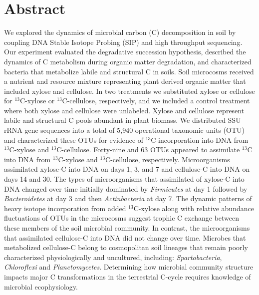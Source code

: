 \section{Abstract} We explored the dynamics of microbial carbon (C)
decomposition in soil by coupling DNA Stable Isotope Probing (SIP) and high
throughput sequencing. Our experiment evaluated the degradative succession
hypothesis, described the dynamics of C metabolism during organic matter
degradation, and characterized bacteria that metabolize labile and structural
C in soils. Soil microcosms received a nutrient and resource mixture
representing plant derived organic matter that included xylose and cellulose.
In two treatments we substituted xylose or cellulose for $^{13}$C-xylose or
$^{13}$C-cellulose, respectively, and we included a control treatment where both
xylose and cellulose were unlabeled. Xylose and cellulose represent labile and
structural C pools abundant in plant biomass. We distributed SSU rRNA gene
sequences into a total of 5,940 operational taxonomic units (OTU) and
characterized these OTUs for evidence of $^{13}$C-incorporation into DNA from
$^{13}$C-xylose and $^{13}$C-cellulose. Forty-nine and 63 OTUs appeared to assimilate $^{13}$C
into DNA from $^{13}$C-xylose and $^{13}$C-cellulose, respectively. Microorganisms
assimilated xylose-C into DNA on days 1, 3, and
7 and cellulose-C into DNA on days 14 and 30. The types of microorganisms that
assimilated of xylose-C into DNA changed over time initially dominated by
\textit{Firmicutes} at day 1 followed by \textit{Bacteroidetes} at day 3 and
then \textit{Actinbacteria} at day 7. The dynamic patterns of heavy isotope
incorporation from added $^{13}$C-xylose along with relative abundance fluctuations
of OTUs in the microcosms suggest trophic C exchange between these members of
the soil microbial community. In contrast, the microorganisms that assimilated
cellulose-C into DNA did not change over time. Microbes that metabolized
cellulose-C belong to cosmopolitan soil lineages that remain poorly
characterized physiologically and uncultured, including:
\textit{Spartobacteria}, \textit{Chloroflexi} and \textit{Planctomycetes}.
Determining how microbial community structure impacts major C transformations
in the terrestrial C-cycle requires knowledge of microbial ecophysiology.
